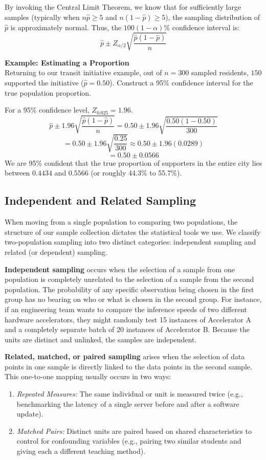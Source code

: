 \documentclass{article}
\begin{document}
By invoking the Central Limit Theorem, we know that for sufficiently large samples (typically when $n\hat{p} \geq 5$ and $n(1-\hat{p}) \geq 5$), the sampling distribution of $\hat{p}$ is approximately normal. Thus, the $100(1-\alpha)$\% confidence interval is:
$$\hat{p} \pm Z_{\alpha/2} \sqrt{\frac{\hat{p}(1-\hat{p})}{n}}$$

\textbf{Example: Estimating a Proportion} \\
Returning to our transit initiative example, out of $n=300$ sampled residents, $150$ supported the initiative ($\hat{p}=0.50$). Construct a 95\% confidence interval for the true population proportion.

For a 95\% confidence level, $Z_{0.025} = 1.96$. 
$$\hat{p} \pm 1.96 \sqrt{\frac{\hat{p}(1-\hat{p})}{n}} = 0.50 \pm 1.96 \sqrt{\frac{0.50(1-0.50)}{300}}$$
$$= 0.50 \pm 1.96 \sqrt{\frac{0.25}{300}} \approx 0.50 \pm 1.96(0.0289)$$
$$= 0.50 \pm 0.0566$$
We are 95\% confident that the true proportion of supporters in the entire city lies between $0.4434$ and $0.5566$ (or roughly 44.3\% to 55.7\%).

\subsection{Independent and Related Sampling}

When moving from a single population to comparing two populations, the structure of our sample collection dictates the statistical tools we use. We classify two-population sampling into two distinct categories: independent sampling and related (or dependent) sampling.

\textbf{Independent sampling} occurs when the selection of a sample from one population is completely unrelated to the selection of a sample from the second population. The probability of any specific observation being chosen in the first group has no bearing on who or what is chosen in the second group. For instance, if an engineering team wants to compare the inference speeds of two different hardware accelerators, they might randomly test 15 instances of Accelerator A and a completely separate batch of 20 instances of Accelerator B. Because the units are distinct and unlinked, the samples are independent.

\textbf{Related, matched, or paired sampling} arises when the selection of data points in one sample is directly linked to the data points in the second sample. This one-to-one mapping usually occurs in two ways:
\begin{enumerate}
    \item \emph{Repeated Measures:} The same individual or unit is measured twice (e.g., benchmarking the latency of a single server before and after a software update).
    \item \emph{Matched Pairs:} Distinct units are paired based on shared characteristics to control for confounding variables (e.g., pairing two similar students and giving each a different teaching method). 
\end{enumerate}
\end{document}
